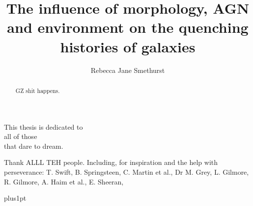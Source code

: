 \documentclass[12pt,useAMS]{ociamthesis}  %
\title{The influence of morphology, AGN and environment on the quenching histories of galaxies}   %
\author{Rebecca Jane Smethurst}             %
\begin{document}
 
\setcounter{secnumdepth}{3}
\setcounter{tocdepth}{3}


\maketitle                  %

\begin{dedication}
This thesis is dedicated to\\
all of those\\
that dare to dream.
\end{dedication}

\begin{acknowledgements}
Thank ALLL TEH people. 
Including, for inspiration and the help with perseverance: T. Swift, B. Springsteen, C. Martin et al., Dr M. Grey, L. Gilmore, R. Gilmore, A. Haim et al., E. Sheeran, 

\end{acknowledgements}

\begin{abstract}  
GZ shit happens.         %
\end{abstract}

\begin{romanpages}          %
\tableofcontents            %
\listoffigures              %
\end{romanpages}            %


\baselineskip=18pt plus1pt
\linespread{1.2}
 \setlength{\parskip}{1em}
 










\end{document}
